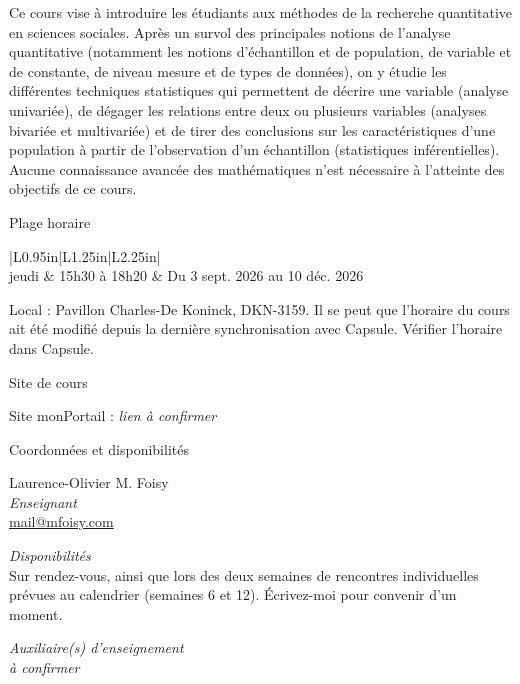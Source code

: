 \documentclass[10pt]{article}
\newcommand{\ulsub}[1]{%
  \needspace{3\baselineskip}%
  \vspace{10pt}%
  {\headfont\fontsize{12.5}{15}\selectfont #1}\par
  \vspace{2pt}%
}
\begin{document}
\vspace{10pt}

{\fontsize{9.5}{12.5}\selectfont
Ce cours vise à introduire les étudiants aux méthodes de la recherche quantitative en sciences sociales. Après un survol des principales notions de l'analyse quantitative (notamment les notions d'échantillon et de population, de variable et de constante, de niveau mesure et de types de données), on y étudie les différentes techniques statistiques qui permettent de décrire une variable (analyse univariée), de dégager les relations entre deux ou plusieurs variables (analyses bivariée et multivariée) et de tirer des conclusions sur les caractéristiques d'une population à partir de l'observation d'un échantillon (statistiques inférentielles). Aucune connaissance avancée des mathématiques n'est nécessaire à l'atteinte des objectifs de ce cours.
\par}

\ulsub{Plage horaire}
{\setlength{\arrayrulewidth}{0.4pt}%
\noindent\begin{tabular}{|L{0.95in}|L{1.25in}|L{2.25in}|}
\hline
{}\\
\hline
\fontsize{9.5}{12}\selectfont jeudi & \fontsize{9.5}{12}\selectfont 15h30 à 18h20 & \fontsize{9.5}{12}\selectfont Du 3 sept. 2026 au 10 déc. 2026\\
\hline
\end{tabular}}

\vspace{6pt}
{\fontsize{8.5}{11}\selectfont Local : Pavillon Charles-De Koninck, DKN-3159. Il se peut que l'horaire du cours ait été modifié depuis la dernière synchronisation avec Capsule. Vérifier l'horaire dans Capsule.\par}

\ulsub{Site de cours}
{\fontsize{9.5}{12}\selectfont Site monPortail : \emph{lien à confirmer}\par}

\ulsub{Coordonnées et disponibilités}
\noindent
\begin{minipage}[t]{3.6in}
  {\fontsize{9.5}{12.5}\selectfont
  Laurence-Olivier M. Foisy\\
  \emph{Enseignant}\\
  \href{mailto:mail@mfoisy.com}{mail@mfoisy.com}\par
  \vspace{6pt}
  \emph{Disponibilités}\\
  Sur rendez-vous, ainsi que lors des deux semaines de rencontres individuelles prévues au calendrier (semaines 6 et 12). Écrivez-moi pour convenir d'un moment.\par}
\end{minipage}\hfill
\begin{minipage}[t]{3.6in}
  {\fontsize{9.5}{12.5}\selectfont
  \emph{Auxiliaire(s) d'enseignement}\\
  \emph{à confirmer}\par}
\end{minipage}
\end{document}
